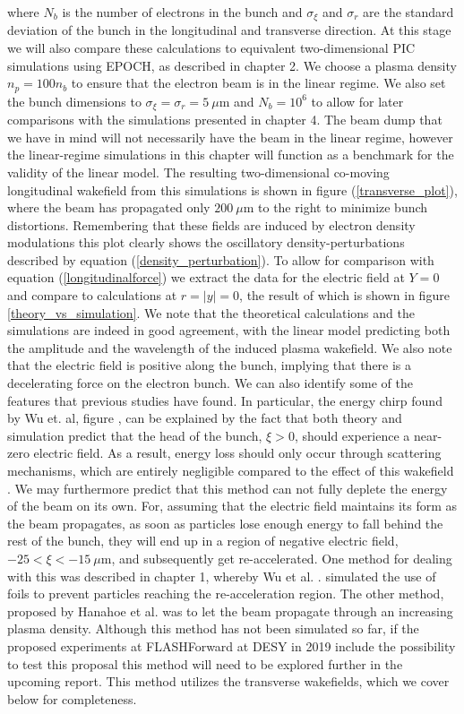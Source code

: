 where $N_b$ is the number of electrons in the bunch and $\sigma_{\xi}$ and $\sigma_r$ are the standard deviation of the bunch in the longitudinal and transverse direction. At this stage we will also compare these calculations to equivalent two-dimensional PIC simulations using EPOCH, as described in chapter 2.  We choose a plasma density $n_p=100n_b$ to ensure that the electron beam is in the linear regime. We also set the bunch dimensions to $\sigma_{\xi}=\sigma_r=5~\mu\text{m}$ and $N_b=10^6$ to allow for later comparisons with the simulations presented in chapter 4. The beam dump that we have in mind will not necessarily have the beam in the linear regime, however the linear-regime simulations in this chapter will function as a benchmark for the validity of the linear model. The resulting two-dimensional co-moving longitudinal wakefield from this simulations is shown in figure (\ref{transverse_plot}), where the beam has propagated only $200~\mu\text{m}$ to the right to minimize bunch distortions. Remembering that these fields are induced by electron density modulations this plot clearly shows the oscillatory density-perturbations described by equation (\ref{density_perturbation}). To allow for comparison with equation (\ref{longitudinalforce}) we extract the data for the electric field at $Y=0$ and compare to calculations at $r=|y|=0$, the result of which is shown in figure \ref{theory_vs_simulation}. We note that the theoretical calculations and the simulations are indeed in good agreement, with the linear model predicting both the amplitude and the wavelength of the induced plasma wakefield. We also note that the electric field is positive along the bunch, implying that there is a decelerating force on the electron bunch. We can also identify some of the features that previous studies have found. In particular, the energy chirp found by Wu et. al, figure , can be explained by the fact that both theory and simulation predict that the head of the bunch, $\xi>0$, should experience a near-zero electric field. As a result, energy loss should only occur through scattering mechanisms, which are entirely negligible compared to the effect of this wakefield \cite{Wu2010}. We may furthermore predict that this method can not fully deplete the energy of the beam on its own. For, assuming that the electric field maintains its form as the beam propagates, as soon as particles lose enough energy to fall behind the rest of the bunch, they will end up in a region of negative electric field, $-25<\xi<-15 ~\mu\text{m}$, and subsequently get re-accelerated. One method for dealing with this was described in chapter 1, whereby Wu et al. \cite{Wu2010}. simulated the use of foils to prevent particles reaching the re-acceleration region. The other method, proposed by Hanahoe et al. \cite{Hanahoe2017} was to let the beam propagate through an increasing plasma density. Although this method has not been simulated so far, if the proposed experiments at FLASHForward at DESY in 2019 include the possibility to test this proposal this method will need to be explored further in the upcoming report. This method utilizes the transverse wakefields, which we cover below for completeness. 



